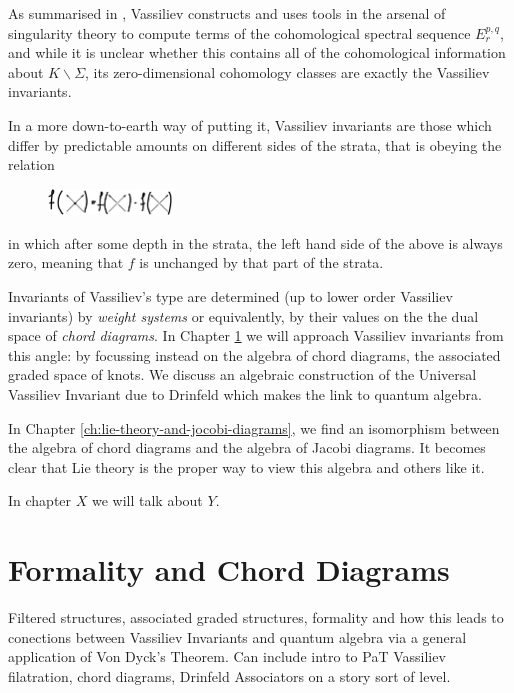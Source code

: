 \documentclass[12pt]{report}
\theoremstyle{regular}
\newcommand{\scaffold}[1]{
\begin{mdframed}[style=scaffold]
        {\color{teal}#1}
\end{mdframed}
}
\begin{document}
        As summarised in \cite{introduction-to-vassiliev-invariants}, Vassiliev constructs and uses tools in the arsenal of singularity theory to compute terms of the cohomological spectral sequence \(E^{p, q}_{r}\), and while it is unclear whether this contains all of the cohomological information about \({K \smallsetminus \Sigma}\), its zero-dimensional cohomology classes are exactly the Vassiliev invariants.

        In a more down-to-earth way of putting it, Vassiliev invariants are those which differ by predictable amounts on different sides of the strata, that is obeying the relation
        \begin{figure}[H]
                \centering
                \includegraphics[width=0.3\textwidth]{graphics/vassiliev_relation.png}
        \end{figure}
        \noindent
        in which after some depth in the strata, the left hand side of the above is always zero, meaning that \(f\) is unchanged by that part of the strata.

        Invariants of Vassiliev's type are determined (up to lower order Vassiliev invariants) by \textit{weight systems} or equivalently, by their values on the the dual space of \textit{chord diagrams}. In Chapter \ref{ch:formality-and-chord-diagrams} we will approach Vassiliev invariants from this angle: by focussing instead on the algebra of chord diagrams, the associated graded space of knots. We discuss an algebraic construction of the Universal Vassiliev Invariant due to Drinfeld which makes the link to quantum algebra.

        In Chapter \ref{ch:lie-theory-and-jocobi-diagrams}, we find an isomorphism between the algebra of chord diagrams and the algebra of Jacobi diagrams. It becomes clear that Lie theory is the proper way to view this algebra and others like it.

        \scaffold{In chapter \(X\) we will talk about \(Y\).}

        \chapter{Formality and Chord Diagrams}
        \label{ch:formality-and-chord-diagrams}

        \scaffold{Filtered structures, associated graded structures, formality and how this leads to conections between Vassiliev Invariants and quantum algebra via a general application of Von Dyck's Theorem. Can include intro to PaT Vassiliev filatration, chord diagrams, Drinfeld Associators on a story sort of level.}
\end{document}
